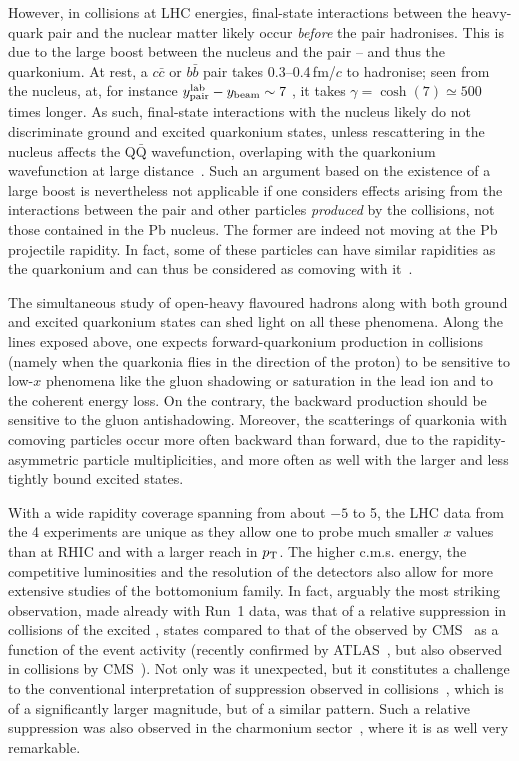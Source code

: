 \documentclass[../report.tex]{subfiles}
\begin{document}
However, in \pPb collisions at LHC energies, final-state interactions between the heavy-quark pair and the nuclear matter likely occur {\it before} the pair hadronises. This is due to the large boost between the nucleus and the pair -- and thus the quarkonium. At rest, a $c \bar c$ or $b\bar b$ pair takes 0.3--0.4\,fm/$c$ to hadronise; seen from the nucleus, at, for instance $y^{\rm lab}_{\rm pair}-y_{\rm beam} \sim 7$ , it takes $\gamma=\cosh(7) \simeq 500$ times longer. As such, final-state interactions with the nucleus likely do not discriminate ground and excited quarkonium states, unless rescattering in the nucleus affects the Q$\bar{\text{Q}}$ wavefunction, overlaping with the quarkonium wavefunction at large distance~\cite{Benesh:1994du}. Such an argument based on the existence of a large boost is nevertheless not applicable if one considers effects arising from the interactions between the pair and other particles {\it produced} by the \pPb collisions, not those contained in the Pb nucleus. The former are indeed not moving at the Pb projectile rapidity. In fact, some of these particles can have similar rapidities as the quarkonium and can thus be considered as comoving with it~\cite{Gavin:1996yd}.
 
The simultaneous study of open-heavy flavoured hadrons along with both ground and excited quarkonium states can shed light on all these phenomena. Along the lines exposed above, one expects forward-quarkonium production in \pPb collisions (namely when the quarkonia flies in the direction of the proton) to be sensitive to low-$x$ phenomena like the gluon shadowing or saturation in the lead ion and to the coherent energy loss. On the contrary, the backward production should be sensitive to the gluon antishadowing. Moreover, the scatterings of quarkonia with comoving particles occur more often backward than forward, due to the rapidity-asymmetric particle multiplicities, and more often as well with the larger and less tightly bound excited states. 
   
With a wide rapidity coverage spanning from about $-5$ to 5, the LHC data from the 4 experiments are unique as they allow one to probe much smaller $x$ values than at RHIC and with a larger reach in $p\sb{\scriptstyle\mathrm{T}}$. The higher c.m.s. energy, the competitive luminosities and the resolution of the detectors also allow for more extensive studies of the bottomonium family. In fact, arguably the most striking observation, made already with Run~1 data, was that of a relative suppression in \pPb collisions of the excited , states compared to that of the  observed by CMS~\cite{Chatrchyan:2013nza} as a function of the event activity (recently confirmed by ATLAS~\cite{Aaboud:2017cif}, but also observed in \pp collisions by CMS~\cite{CMS-PAS-BPH-14-009}). Not only was it unexpected, but it constitutes a challenge to the conventional interpretation of suppression observed in \PbPb collisions~\cite{Chatrchyan:2012lxa,Sirunyan:2017lzi,Sirunyan:2018nsz}, which is of a significantly larger magnitude, but of a similar pattern. Such a relative suppression was also observed in the charmonium sector~\cite{Abelev:2014zpa}, where it is as well very remarkable.
\end{document}
